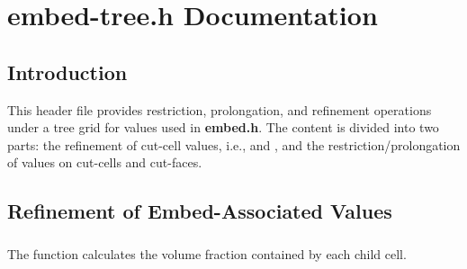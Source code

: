 \chapter{embed-tree.h Documentation}
\ifsingle
\maketitle
\fi
\chaptermeta[draft][2025-06-09]

\section{Introduction}
This header file provides restriction, prolongation, and refinement operations under a tree grid for values used in \textbf{embed.h}. The content is divided into two parts: the refinement of cut-cell values, i.e.,  and , and the restriction/prolongation of values on cut-cells and cut-faces.

\section{Refinement of Embed-Associated Values}
\subsection{}
The  function calculates the volume fraction contained by each child cell.

